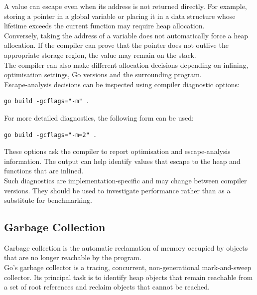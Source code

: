 A value can escape even when its address is not returned directly. For example, storing a pointer in a global variable or placing it in a data structure whose lifetime exceeds the current function may require heap allocation.\\

Conversely, taking the address of a variable does not automatically force a heap allocation. If the compiler can prove that the pointer does not outlive the appropriate storage region, the value may remain on the stack.\\

The compiler can also make different allocation decisions depending on inlining, optimisation settings, Go versions and the surrounding program.\\

Escape-analysis decisions can be inspected using compiler diagnostic options:

\begin{lstlisting}
go build -gcflags="-m" .
\end{lstlisting}

For more detailed diagnostics, the following form can be used:

\begin{lstlisting}
go build -gcflags="-m=2" .
\end{lstlisting}

These options ask the compiler to report optimisation and escape-analysis information. The output can help identify values that escape to the heap and functions that are inlined.\\

Such diagnostics are implementation-specific and may change between compiler versions. They should be used to investigate performance rather than as a substitute for benchmarking.\\

\subsection{Garbage Collection}

Garbage collection is the automatic reclamation of memory occupied by objects that are no longer reachable by the program.\\

Go's garbage collector is a tracing, concurrent, non-generational mark-and-sweep collector. Its principal task is to identify heap objects that remain reachable from a set of root references and reclaim objects that cannot be reached.\\

